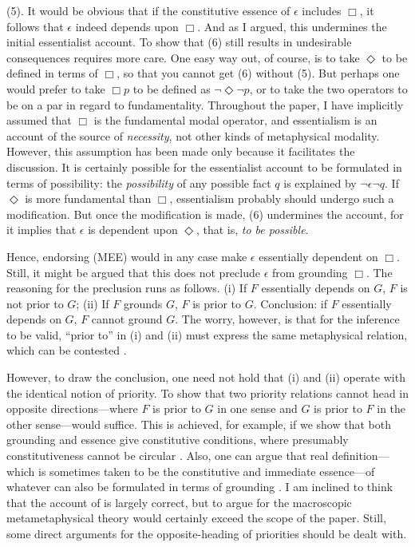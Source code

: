 \documentclass[12pt]{article}
\begin{document}
\par
(5). It would be obvious that if the constitutive essence of $\epsilon$ includes $\Box$, it follows that $\epsilon$ indeed depends upon $\Box$. And as I argued, this undermines the initial essentialist account. To show that (6) still results in undesirable consequences requires more care. One easy way out, of course, is to take $\Diamond$ to be defined in terms of $\Box$, so that you cannot get (6) without (5). But perhaps one would prefer to take $\Box p$ to be defined as $\lnot \Diamond \lnot p$, or to take the two operators to be on a par in regard to fundamentality. Throughout the paper, I have implicitly assumed that $\Box$ is the fundamental modal operator, and essentialism is an account of the source of \textit{necessity}, not other kinds of metaphysical modality. However, this assumption has been made only because it facilitates the discussion. It is certainly possible for the essentialist account to be formulated in terms of possibility: the \textit{possibility} of any possible fact $q$ is explained by $\lnot \epsilon \lnot q$. If $\Diamond$ is more fundamental than $\Box$, essentialism probably should undergo such a modification. But once the modification is made, (6) undermines the account, for it implies that $\epsilon$ is dependent upon $\Diamond$, that is, \textit{to be possible}. 
\par
Hence, endorsing (MEE) would in any case make $\epsilon$ essentially dependent on $\Box$. Still, it might be argued that this does not preclude $\epsilon$ from grounding $\Box$. The reasoning for the preclusion runs as follows. (i) If $F$ essentially depends on $G$, $F$ is not prior to $G$; (ii) If $F$ grounds $G$, $F$ is prior to $G$. Conclusion: if $F$ essentially depends on $G$, $F$ cannot ground $G$. The worry, however, is that for the inference to be valid, ``prior to'' in (i) and (ii) must express the same metaphysical relation, which can be contested \citep{Vogt2026-VOGDAD-2}. 
\par
However, to draw the conclusion, one need not hold that (i) and (ii) operate with the identical notion of priority. To show that two priority relations cannot head in opposite directions---where $F$ is prior to $G$ in one sense and $G$ is prior to $F$ in the other sense---would suffice. This is achieved, for example, if we show that both grounding and essence give constitutive conditions, where presumably constitutiveness cannot be circular \citep{Fine2015-FINUFF}. Also, one can argue that real definition---which is sometimes taken to be the constitutive and immediate essence---of whatever can also be formulated in terms of grounding \citep[198--9]{Rosen2015-ROSRD-2}. I am inclined to think that the account of \citet{Fine2015-FINUFF} is largely correct, but to argue for the macroscopic metametaphysical theory would certainly exceed the scope of the paper. Still, some direct arguments for the opposite-heading of priorities should be dealt with. 
\end{document}
